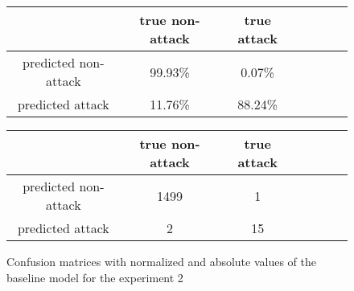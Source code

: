 \documentclass{article}
\begin{document}


\begin{figure}[h]
    \centering
    \begin{tabular}{ |c|c|c|c|c|c|c| }
     \hline
      & true non-attack & true attack \\
     \hline
     predicted non-attack & 99.93\% & 0.07\% \\
     \hline
     predicted attack & 11.76\% & 88.24\% \\
     \hline
    \end{tabular}

    \vspace{0.2cm}

    \centering
    \begin{tabular}{ |c|c|c|c|c|c|c| }
     \hline
      & true non-attack & true attack \\
     \hline
     predicted non-attack & 1499 & 1 \\
     \hline
     predicted attack & 2 & 15 \\
     \hline
    \end{tabular}
    \caption{Confusion matrices with normalized and absolute values of the baseline model for the experiment 2}
    \label{fig-exp2-baseline}
\end{figure}


\end{document}
